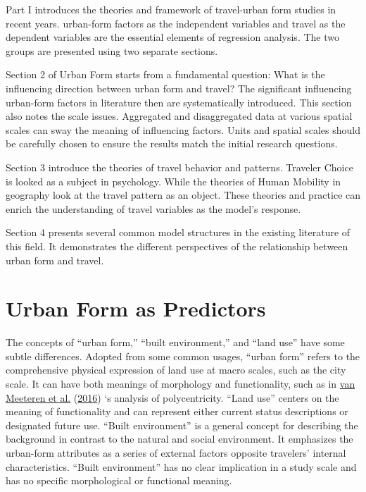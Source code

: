 \documentclass[
  12pt,
]{article}
\begin{document}
Part I introduces the theories and framework of travel-urban form studies in recent years.
urban-form factors as the independent variables and travel as the dependent variables are the essential elements of regression analysis.
The two groups are presented using two separate sections.

Section 2 of Urban Form starts from a fundamental question: What is the influencing direction between urban form and travel?
The significant influencing urban-form factors in literature then are systematically introduced.
This section also notes the scale issues.
Aggregated and disaggregated data at various spatial scales can sway the meaning of influencing factors.
Units and spatial scales should be carefully chosen to ensure the results match the initial research questions.

Section 3 introduce the theories of travel behavior and patterns.
Traveler Choice is looked as a subject in psychology.
While the theories of Human Mobility in geography look at the travel pattern as an object.
These theories and practice can enrich the understanding of travel variables as the model's response.

Section 4 presents several common model structures in the existing literature of this field.
It demonstrates the different perspectives of the relationship between urban form and travel.

\hypertarget{form}{%
\section{Urban Form as Predictors}\label{form}}

The concepts of ``urban form,'' ``built environment,'' and ``land use'' have some subtle differences. Adopted from some common usages, ``urban form'' refers to the comprehensive physical expression of land use at macro scales, such as the city scale. It can have both meanings of morphology and functionality, such as in \protect\hyperlink{ref-vanmeeterenPacifyingBabelTower2016}{van Meeteren et al.} (\protect\hyperlink{ref-vanmeeterenPacifyingBabelTower2016}{2016}) `s analysis of polycentricity. ``Land use'' centers on the meaning of functionality and can represent either current status descriptions or designated future use. ``Built environment'' is a general concept for describing the background in contrast to the natural and social environment. It emphasizes the urban-form attributes as a series of external factors opposite travelers' internal characteristics. ``Built environment'' has no clear implication in a study scale and has no specific morphological or functional meaning.
\end{document}
